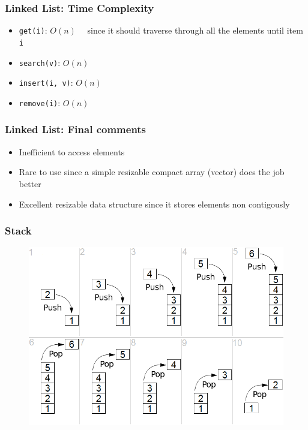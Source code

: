 \documentclass{beamer}
\begin{document}
\begin{frame}[fragile]
\frametitle{Linked List: Time Complexity}
	\begin{itemize}
		\item \verb|get(i)|: \color{red}$O(n)\quad$\color{black} since it should traverse through all the elements until item \verb|i|
		\item \verb|search(v)|: \color{red}$O(n)$\color{black}
		\item \verb|insert(i, v)|: \color{red}$O(n)$\color{black}
		\item \verb|remove(i)|: \color{red}$O(n)$\color{black}
	\end{itemize}
\end{frame}

\begin{frame}
\frametitle{Linked List: Final comments}
	\begin{itemize}
		\item Inefficient to access elements
		\item Rare to use since a simple resizable compact array (vector) does the job better
		\item Excellent resizable data structure since it stores elements non contigously
	\end{itemize}
\end{frame}


\begin{frame}
\frametitle{Stack}
	\begin{figure}
		\centering
		\includegraphics[scale=0.38]{imgs/2-LDS/stack/stack.png}
	\end{figure}	
\end{frame}
\end{document}
